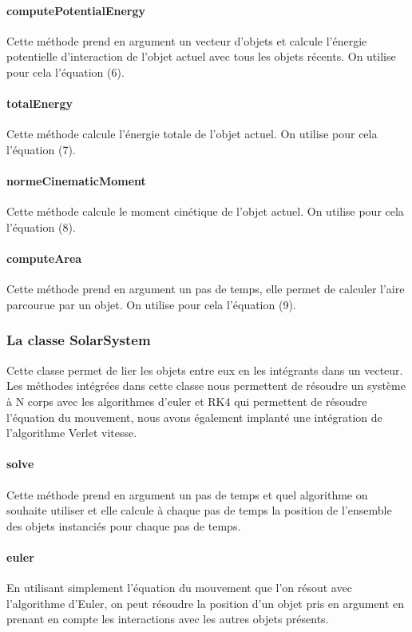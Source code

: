 \documentclass[11pt]{article}
\begin{document}
\paragraph{computePotentialEnergy \break}
Cette méthode prend en argument un vecteur d'objets et calcule l'énergie potentielle d'interaction de l'objet actuel avec tous les objets récents.
On utilise pour cela l'équation (6).

\paragraph{totalEnergy \break}
Cette méthode calcule l'énergie totale de l'objet actuel. On utilise pour cela l'équation (7).

\paragraph{normeCinematicMoment \break}
Cette méthode calcule le moment cinétique de l'objet actuel. On utilise pour cela l'équation (8).

\paragraph{computeArea \break}
Cette méthode prend en argument un pas de temps, elle permet de calculer l'aire parcourue par un objet. On utilise pour cela l'équation (9).

\subsubsection{La classe SolarSystem}

Cette classe permet de lier les objets entre eux en les intégrants dans un vecteur. Les méthodes intégrées dans cette classe nous permettent de résoudre un système à N corps avec les algorithmes d'euler et RK4 qui permettent de résoudre l'équation du mouvement, nous avons également implanté une intégration de l'algorithme Verlet vitesse.

\paragraph{solve \break}
Cette méthode prend en argument un pas de temps et quel algorithme on souhaite utiliser et elle calcule à chaque pas de temps la position de l'ensemble des objets instanciés pour chaque pas de temps.

\paragraph{euler \break}
En utilisant simplement l'équation du mouvement que l'on résout avec l'algorithme d'Euler, on peut résoudre la position d'un objet pris en argument en prenant en compte les interactions avec les autres objets présents.
\end{document}

